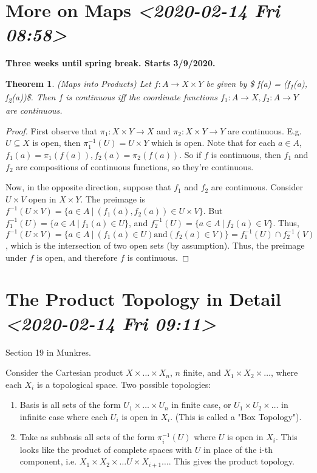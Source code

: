 \documentclass[11pt]{article}
\newtheorem{theorem}{Theorem}[section]
\begin{document}
\section{More on Maps \textit{<2020-02-14 Fri 08:58>}}
\label{sec:org782f495}

\textbf{Three weeks until spring break. Starts 3/9/2020.}

\begin{theorem}
(Maps into Products) Let \(f: A\rightarrow X\times Y\) be given by \$
f(a) = (f\textsubscript{1}(a), f\textsubscript{2}(a))\$. Then \(f\) is continuous iff the coordinate
functions \(f_1:A\rightarrow X, f_2: A\rightarrow Y\) are continuous. 
\end{theorem}

\begin{proof}
First observe that \(\pi_1:X\times Y\rightarrow X\) and \(\pi_2:X\times
Y\rightarrow Y\) are continuous. E.g. \(U \subseteq X\) is open, then
\(\pi_1^{-1}(U) = U\times Y\) which is open. Note that for each \(a\in
A\), \(f_1(a) = \pi_1(f(a)), f_2(a) = \pi_2(f(a))\). So if \(f\) is
continuous, then \(f_1\) and \(f_2\) are compositions of continuous
functions, so they're continuous. 

Now, in the opposite direction, suppose that \(f_1\) and \(f_2\) are
continuous. Consider \(U\times V\) open in \(X\times Y\). The preimage is
\(f^{-1}(U\times V) = \{ a \in A\ |\ (f_1(a),f_2(a))\in U\times
V\}\). But \(f_1^{-1}(U) = \{ a \in A\ |\ f_1(a) \in U\}\), and
\(f_2^{-1}(U) = \{ a \in A\ |\ f_2(a) \in V \}\). Thus, \(f^{-1}(U\times
V) = \{ a \in A\ |\ (f_1(a) \in U) \text{and} (f_2(a) \in V) \} =
f_1^{-1}(U)\cap f_2^{-1}(V)\), which is the intersection of two open
sets (by assumption). Thus, the preimage under \(f\) is open, and
therefore \(f\) is continuous. 
\end{proof}

\section{The Product Topology in Detail \textit{<2020-02-14 Fri 09:11>}}
\label{sec:org3024cea}
Section 19 in Munkres.

Consider the Cartesian product \(X\times\ldots\times X_n\), \(n\) finite,
and \(X_1\times X_2\times\ldots\), where each \(X_i\) is a topological
space. Two possible topologies: 

\begin{enumerate}
\item Basis is all sets of the form \(U_1\times\ldots\times U_n\) in finite
case, or \(U_1\times U_2\times\ldots\) in infinite case where each
\(U_i\) is open in \(X_i\). (This is called a "Box Topology").
\item Take as subbasis all sets of the form \(\pi_i^{-1}(U)\) where \(U\) is
open in \(X_i\). This looks like the product of complete spaces with
\(U\) in place of the i-th component, i.e. \(X_1\times
   X_2\times\ldots U\times X_{i+1}\ldots\). This gives the product
topology.
\end{enumerate}
\end{document}
